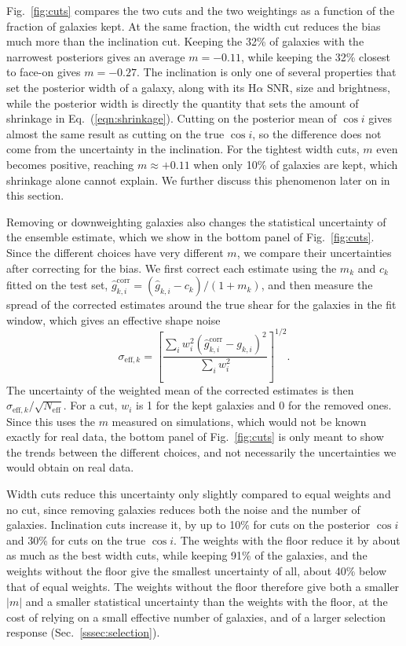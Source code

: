 Fig.~\ref{fig:cuts} compares the two cuts and the two weightings as a function of the fraction of galaxies kept. At the same fraction, the width cut reduces the bias much more than the inclination cut. Keeping the 32\% of galaxies with the narrowest posteriors gives an average $m = -0.11$, while keeping the 32\% closest to face-on gives $m = -0.27$. The inclination is only one of several properties that set the posterior width of a galaxy, along with its H$\alpha$ SNR, size and brightness, while the posterior width is directly the quantity that sets the amount of shrinkage in Eq.~(\ref{eqn:shrinkage}). Cutting on the posterior mean of $\cos i$ gives almost the same result as cutting on the true $\cos i$, so the difference does not come from the uncertainty in the inclination. For the tightest width cuts, $m$ even becomes positive, reaching $m \approx +0.11$ when only 10\% of galaxies are kept, which shrinkage alone cannot explain. We further discuss this phenomenon later on in this section.

Removing or downweighting galaxies also changes the statistical uncertainty of the ensemble estimate, which we show in the bottom panel of Fig.~\ref{fig:cuts}. Since the different choices have very different $m$, we compare their uncertainties after correcting for the bias. We first correct each estimate using the $m_k$ and $c_k$ fitted on the test set, $\hat{g}^\mathrm{corr}_{k,i} = (\hat{g}_{k,i} - c_k)/(1+m_k)$, and then measure the spread of the corrected estimates around the true shear for the galaxies in the fit window, which gives an effective shape noise
\begin{equation}
\label{eqn:sigma-eff}
    \sigma_{\mathrm{eff},k} = \left[\frac{\sum_i w_i^2 \left(\hat{g}^\mathrm{corr}_{k,i} - g_{k,i}\right)^2}{\sum_i w_i^2}\right]^{1/2}.
\end{equation}
The uncertainty of the weighted mean of the corrected estimates is then $\sigma_{\mathrm{eff},k}/\sqrt{N_\mathrm{eff}}$. For a cut, $w_i$ is 1 for the kept galaxies and 0 for the removed ones. Since this uses the $m$ measured on simulations, which would not be known exactly for real data, the bottom panel of Fig.~\ref{fig:cuts} is only meant to show the trends between the different choices, and not necessarily the uncertainties we would obtain on real data.

Width cuts reduce this uncertainty only slightly compared to equal weights and no cut, since removing galaxies reduces both the noise and the number of galaxies. Inclination cuts increase it, by up to 10\% for cuts on the posterior $\cos i$ and 30\% for cuts on the true $\cos i$. The weights with the floor reduce it by about as much as the best width cuts, while keeping 91\% of the galaxies, and the weights without the floor give the smallest uncertainty of all, about 40\% below that of equal weights. The weights without the floor therefore give both a smaller $|m|$ and a smaller statistical uncertainty than the weights with the floor, at the cost of relying on a small effective number of galaxies, and of a larger selection response (Sec.~\ref{sssec:selection}).

